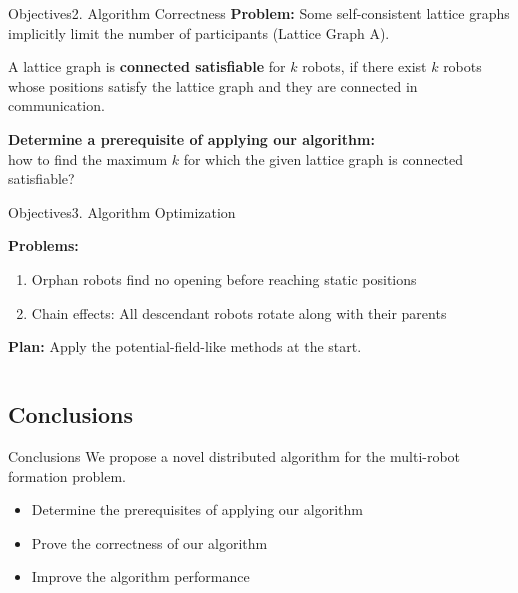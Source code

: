 \documentclass[10pt]{beamer}
\begin{document}
\begin{frame}{Objectives}{2. Algorithm Correctness}
  \textbf{Problem:} Some self-consistent lattice graphs implicitly limit the
  number of participants (Lattice Graph A).
  
  \begin{definition}
    \small{A lattice graph is \textbf{connected satisfiable} for $k$ robots, if
      there exist $k$ robots whose positions satisfy the lattice graph and they
      are connected in communication.}
  \end{definition}
   
  \textbf{Determine a prerequisite of applying our algorithm:}\\
  how to find the maximum $k$ for which the given lattice graph is
  connected satisfiable?
\end{frame}

\begin{frame}{Objectives}{3. Algorithm Optimization}
  \small{
    \textbf{Problems:}
    \begin{enumerate}
    \item Orphan robots find no opening before reaching static positions
    \item Chain effects: All descendant robots rotate along with their parents
    \end{enumerate}
    \textbf{Plan:} Apply the potential-field-like methods at the start.
  }
  \begin{columns}
    \begin{column}{0.4\textwidth}
      \begin{center}
        
      \end{center}
    \end{column}
    \begin{column}{0.5\textwidth}
    \end{column}
  \end{columns}
\end{frame}

\subsection{Conclusions}
\begin{frame}{Conclusions}
  We propose a novel distributed algorithm for the multi-robot formation
  problem. 
  \begin{itemize}
  \item Determine the prerequisites of applying our algorithm
  \item Prove the correctness of our algorithm 
  \item Improve the algorithm performance
  \end{itemize}

\end{frame}
\end{document}
